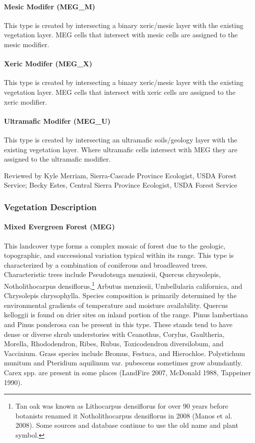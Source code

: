 \paragraph{Mesic Modifer (MEG\_M)}
This type is created by intersecting a binary xeric/mesic layer with the existing vegetation layer. MEG cells that intersect with mesic cells are assigned to the mesic modifier.
\paragraph{Xeric Modifer (MEG\_X)}
This type is created by intersecting a binary xeric/mesic layer with the existing vegetation layer. MEG cells that intersect with xeric cells are assigned to the xeric modifier.
\paragraph{Ultramafic Modifer (MEG\_U)}
This type is created by intersecting an ultramafic soils/geology layer with the existing vegetation layer. Where ultramafic cells intersect with MEG they are assigned to the ultramafic modifier.

Reviewed by Kyle Merriam, Sierra-Cascade Province Ecologist, USDA Forest Service; Becky Estes, Central Sierra Province Ecologist, USDA Forest Service


\subsubsection{Vegetation Description}
\paragraph{Mixed Evergreen Forest (MEG)} 	This landcover type forms a complex mosaic of forest due to the geologic, topographic, and successional variation typical within its range. This type is characterized by a combination of coniferous and broadleaved trees. Characteristic trees include Pseudotsuga menziesii, Quercus chrysolepis, Notholithocarpus densiflorus,\footnote{Tan oak was known as Lithocarpus densiflorus for over 90 years before botanists renamed it Notholithocarpus densiflorus in 2008 (Manos et al. 2008). Some sources and database continue to use the old name and plant symbol.}  Arbutus menziesii, Umbellularia californica, and Chrysolepis chrysophylla. Species composition is primarily determined by the environmental gradients of temperature and moisture availability. Quercus kelloggii is found on drier sites on inland portion of the range. Pinus lambertiana and Pinus ponderosa can be present in this type. These stands tend to have dense or diverse shrub understories with Ceanothus, Corylus, Gaultheria, Morella, Rhododendron, Ribes, Rubus, Toxicodendron diversilobum, and Vaccinium. Grass species include Bromus, Festuca, and Hierochloe. Polystichum munitum and Pteridium aquilinum var. pubescens sometimes grow abundantly. Carex spp. are present in some places (LandFire 2007, McDonald 1988, Tappeiner 1990).

